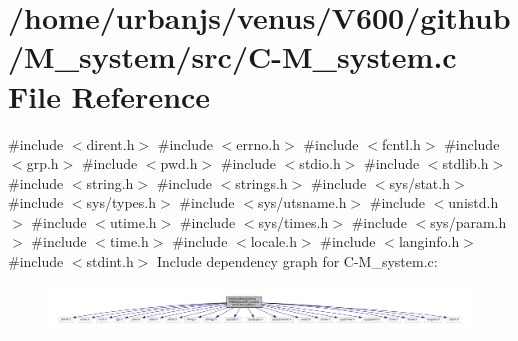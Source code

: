\hypertarget{C-M__system_8c}{}\section{/home/urbanjs/venus/\+V600/github/\+M\+\_\+system/src/\+C-\/\+M\+\_\+system.c File Reference}
\label{C-M__system_8c}
{\ttfamily \#include $<$dirent.\+h$>$}\newline
{\ttfamily \#include $<$errno.\+h$>$}\newline
{\ttfamily \#include $<$fcntl.\+h$>$}\newline
{\ttfamily \#include $<$grp.\+h$>$}\newline
{\ttfamily \#include $<$pwd.\+h$>$}\newline
{\ttfamily \#include $<$stdio.\+h$>$}\newline
{\ttfamily \#include $<$stdlib.\+h$>$}\newline
{\ttfamily \#include $<$string.\+h$>$}\newline
{\ttfamily \#include $<$strings.\+h$>$}\newline
{\ttfamily \#include $<$sys/stat.\+h$>$}\newline
{\ttfamily \#include $<$sys/types.\+h$>$}\newline
{\ttfamily \#include $<$sys/utsname.\+h$>$}\newline
{\ttfamily \#include $<$unistd.\+h$>$}\newline
{\ttfamily \#include $<$utime.\+h$>$}\newline
{\ttfamily \#include $<$sys/times.\+h$>$}\newline
{\ttfamily \#include $<$sys/param.\+h$>$}\newline
{\ttfamily \#include $<$time.\+h$>$}\newline
{\ttfamily \#include $<$locale.\+h$>$}\newline
{\ttfamily \#include $<$langinfo.\+h$>$}\newline
{\ttfamily \#include $<$stdint.\+h$>$}\newline
Include dependency graph for C-\/\+M\+\_\+system.c\+:\nopagebreak
\begin{figure}[H]
\begin{center}
\leavevmode
\includegraphics[width=350pt]{C-M__system_8c__incl}
\end{center}
\end{figure}

